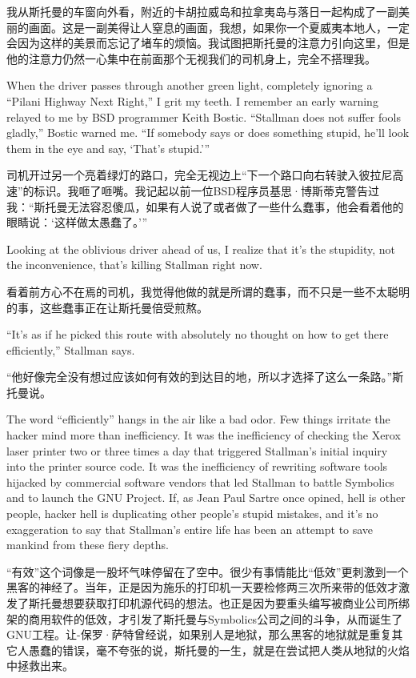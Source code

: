 \ifdefined\chs
我从斯托曼的车窗向外看，附近的卡胡拉威岛和拉拿夷岛与落日一起构成了一副美丽的画面。这是一副美得让人窒息的画面，我想，如果你一个夏威夷本地人，一定会因为这样的美景而忘记了堵车的烦恼。我试图把斯托曼的注意力引向这里，但是他的注意力仍然一心集中在前面那个无视我们的司机身上，完全不搭理我。
\fi

\ifdefined\eng
When the driver passes through another green light, completely ignoring a ``Pilani Highway Next Right,'' I grit my teeth. I remember an early warning relayed to me by BSD programmer Keith Bostic. ``Stallman does not suffer fools gladly,'' Bostic warned me. ``If somebody says or does something stupid, he'll look them in the eye and say, `That's stupid.'\hspace{0.01in}''
\fi

\ifdefined\chs
司机开过另一个亮着绿灯的路口，完全无视边上``下一个路口向右转驶入彼拉尼高速''的标识。我咂了咂嘴。我记起以前一位BSD程序员基思·博斯蒂克警告过我：``斯托曼无法容忍傻瓜，如果有人说了或者做了一些什么蠢事，他会看着他的眼睛说：`这样做太愚蠢了。'\hspace{0.01in}''
\fi

\ifdefined\eng
Looking at the oblivious driver ahead of us, I realize that it's the stupidity, not the inconvenience, that's killing Stallman right now.
\fi

\ifdefined\chs
看着前方心不在焉的司机，我觉得他做的就是所谓的蠢事，而不只是一些不太聪明的事，这些蠢事正在让斯托曼倍受煎熬。
\fi

\ifdefined\eng
``It's as if he picked this route with absolutely no thought on how to get there efficiently,'' Stallman says.
\fi

\ifdefined\chs
``他好像完全没有想过应该如何有效的到达目的地，所以才选择了这么一条路。''斯托曼说。
\fi

\ifdefined\eng
The word ``efficiently'' hangs in the air like a bad odor. Few things irritate the hacker mind more than inefficiency. It was the inefficiency of checking the Xerox laser printer two or three times a day that triggered Stallman's initial inquiry into the printer source code. It was the inefficiency of rewriting software tools hijacked by commercial software vendors that led Stallman to battle Symbolics and to launch the GNU Project. If, as Jean Paul Sartre once opined, hell is other people, hacker hell is duplicating other people's stupid mistakes, and it's no exaggeration to say that Stallman's entire life has been an attempt to save mankind from these fiery depths.
\fi

\ifdefined\chs
``有效''这个词像是一股坏气味停留在了空中。很少有事情能比``低效''更刺激到一个黑客的神经了。当年，正是因为施乐的打印机一天要检修两三次所来带的低效才激发了斯托曼想要获取打印机源代码的想法。也正是因为要重头编写被商业公司所绑架的商用软件的低效，才引发了斯托曼与Symbolics公司之间的斗争，从而诞生了GNU工程。让-保罗·萨特曾经说，如果别人是地狱，那么黑客的地狱就是重复其它人愚蠢的错误，毫不夸张的说，斯托曼的一生，就是在尝试把人类从地狱的火焰中拯救出来。
\fi

